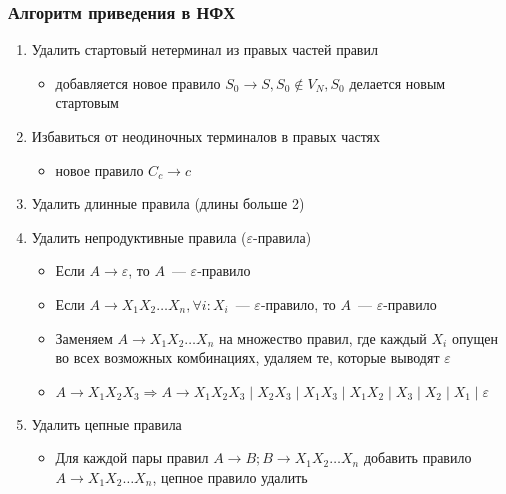 \documentclass{beamer}
\begin{document}
\begin{frame}[fragile]
  \transwipe[direction=90]
  \frametitle{Алгоритм приведения в НФХ}

  \begin{enumerate}
    \item Удалить стартовый нетерминал из правых частей правил
    \begin{itemize}
      \item добавляется новое правило $S_0 \to S, S_0 \notin V_N, S_0$ делается новым стартовым
    \end{itemize}
    \item Избавиться от неодиночных терминалов в правых частях
    \begin{itemize}
      \item новое правило $C_c \to c$
    \end{itemize}
    \item Удалить длинные правила (длины больше 2)
    \item Удалить непродуктивные правила ($\varepsilon$-правила)
    \begin{itemize}
      \item Если $A \to \varepsilon$, то $A$~--- $\varepsilon$-правило
      \item Если $A \to X_1 X_2 \dots X_n, \forall i: X_i$~--- $\varepsilon$-правило, то $A$~--- $\varepsilon$-правило
      \item Заменяем $A \to X_1 X_2 \dots X_n$ на множество правил, где каждый $X_i$ опущен во всех возможных комбинациях, удаляем те, которые выводят $\varepsilon$
      \item $A \to X_1 X_2 X_3 \Rightarrow A \to X_1 X_2 X_3 \mid X_2 X_3 \mid X_1 X_3 \mid X_1 X_2 \mid X_3 \mid X_2 \mid X_1 \mid \varepsilon$
    \end{itemize}
    \item Удалить цепные правила
    \begin{itemize}
      \item Для каждой пары правил $A \to B; B \to  X_1 X_2 \dots X_n$ добавить правило $A \to  X_1 X_2 \dots X_n$, цепное правило удалить
    \end{itemize}
  \end{enumerate}
\end{frame}
\end{document}
